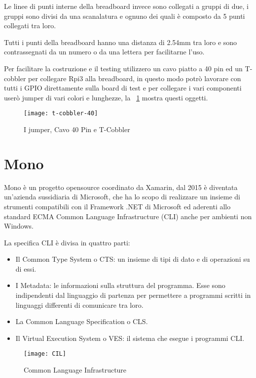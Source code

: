 Le linee di punti interne della breadboard invece sono collegati a gruppi di due, i gruppi sono divisi da una scanalatura e ognuno dei quali è composto da 5 punti collegati tra loro.

Tutti i punti della breadboard  hanno una distanza di 2.54mm tra loro e sono contrassegnati da un numero o da una lettera per facilitarne l'uso.

Per facilitare la costruzione e il testing utilizzero un cavo piatto a 40 pin ed un T-cobbler per collegare Rpi3 alla breadboard, in questo modo potrò lavorare con tutti i GPIO direttamente sulla board di test e per collegare i vari componenti userò jumper di vari colori e lunghezze, la \figurename~\ref{fig:t-cobbler-40} mostra questi oggetti. 


\begin{figure}[htbp!] 
	\centering    
	\texttt{[image: t-cobbler-40]}
	\caption[t-cobbler-40]{I jumper, Cavo 40 Pin e T-Cobbler}
	\label{fig:t-cobbler-40}
\end{figure}


\section{Mono}
Mono è un progetto opensource coordinato da Xamarin, dal 2015 è diventata un'azienda sussidiaria di Microsoft, che ha lo scopo di realizzare  un insieme di strumenti compatibili con il Framework .NET di Microsoft ed aderenti allo standard  ECMA Common Language Infrastructure (CLI)  anche per ambienti non Windows.


La specifica CLI è divisa in quattro parti:
\begin{itemize}
\item Il Common Type System o CTS: un insieme di tipi di dato e di operazioni su di essi.
\item I Metadata: le informazioni sulla struttura del programma. Esse sono indipendenti dal linguaggio di partenza per permettere a programmi scritti in linguaggi differenti di comunicare tra loro.
\item La Common Language Specification o CLS.
\item Il Virtual Execution System o VES: il sistema che esegue i programmi CLI.
\end{itemize}
\begin{figure}[htbp!] 
	\centering    
	\texttt{[image: CIL]}
	\caption[CIL]{Common Language Infrastructure}
	\label{fig:CIL}
\end{figure}

